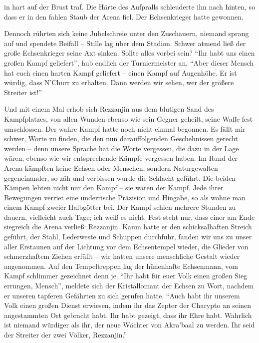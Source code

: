 in hart auf der Brust traf. Die Härte des Aufpralls schleuderte ihn nach hinten, so dass er in den fahlen Staub der Arena fiel. Der Echsenkrieger hatte gewonnen.

Dennoch rührten sich keine Jubelschreie unter den Zuschauern, niemand sprang auf und spendete Beifall -- Stille lag über dem Stadion. Schwer atmend ließ der große Echsenkrieger seine Axt sinken. Sollte alles vorbei sein? ``Ihr habt uns einen großen Kampf geliefert'', hub endlich der Turniermeister an, ``Aber dieser Mensch hat euch einen harten Kampf geliefert -- einen Kampf auf Augenhöhe. Er ist würdig, dass N'Churr zu erhalten. Dann werden wir sehen, wer der größere Streiter ist!''

Und mit einem Mal erhob sich Rezzanjin aus dem blutigen Sand des Kampfplatzes, von allen Wunden ebenso wie sein Gegner geheilt, seine Waffe fest umschlossen. Der wahre Kampf hatte noch nicht einmal begonnen. Es fällt mir schwer, Worte zu finden, die den nun darauffolgenden Geschehnissen gerecht werden -- denn unsere Sprache hat die Worte vergessen, die dazu in der Lage wären, ebenso wie wir entsprechende Kämpfe vergessen haben. Im Rund der Arena kämpften keine Echsen oder Menschen, sondern Naturgewalten gegeneinander, so zäh und verbissen wurde die Schlacht geführt. Die beiden Kämpen lebten nicht nur den Kampf -- sie waren der Kampf. Jede ihrer Bewegungen verriet eine underrische Präzision und Hingabe, so als wohne man einem Kampf zweier Halbgötter bei. Der Kampf schien mehrere Stunden zu dauern, vielleicht auch Tage; ich weiß es nicht. Fest steht nur, dass einer am Ende siegreich die Arena verließ: Rezzanjin. Kaum hatte er den schicksalhaften Streich geführt, der Stahl, Lederweste und Schuppen durchfuhr, fanden wir uns zu unser aller Erstaunen auf der Lichtung vor dem Echsentempel wieder, die Glieder von schmerzhaftem Ziehen erfüllt -- wir hatten unsere menschliche Gestalt wieder angenommen. Auf den Tempeltreppen lag der hünenhafte Echsenmann, vom Kampf schlimmer gezeichnet denn je. ``Ihr habt für euer Volk einen großen Sieg errungen, Mensch'', meldete sich der Kristallomant der Echsen zu Wort, nachdem er unseren tapferen Gefährten zu sich gerufen hatte. ``Auch habt ihr unserem Volk einen großen Dienst erwiesen, indem ihr das Zepter der Charypto an seinen angestammten Ort gebracht habt. Ihr habt gezeigt, dass ihr Ehre habt. Wahrlich ist niemand würdiger als ihr, der neue Wächter von Akra'baal zu werden. Ihr seid der Streiter der zwei Völker, Rezzanjin.''

